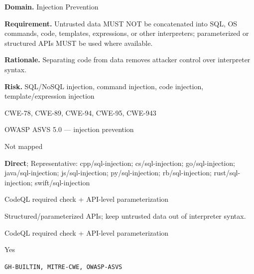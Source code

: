 \documentclass[10pt,letterpaper]{article}
\newcommand{\prioritybadge}[2]{\tcbox[on line,boxrule=0pt,arc=1.2mm,boxsep=0.7mm,left=1mm,right=1mm,top=0.4mm,bottom=0.4mm,colback=#2!12,coltext=#2]{\scriptsize\bfseries #1}}
\begin{document}
\begin{rulebox}[title={\texttt{SCS-ALL-INJ-001} \hfill \prioritybadge{Critical Control}{Critical}}]
\textbf{Domain.} Injection Prevention

\textbf{Requirement.} Untrusted data MUST NOT be concatenated into SQL, OS commands, code, templates, expressions, or other interpreters; parameterized or structured APIs MUST be used where available.

\textbf{Rationale.} Separating code from data removes attacker control over interpreter syntax.

\textbf{Risk.} SQL/NoSQL injection, command injection, code injection, template/expression injection

\begin{description}[leftmargin=2.65cm,labelwidth=2.3cm,style=nextline,itemsep=1pt,topsep=3pt]
  \item[CWE] CWE-78, CWE-89, CWE-94, CWE-95, CWE-943
  \item[OWASP] OWASP ASVS 5.0 --- injection prevention
  \item[CERT] Not mapped
  \item[CodeQL] \textbf{Direct}; Representative: cpp/sql-injection; cs/sql-injection; go/sql-injection; java/sql-injection; js/sql-injection; py/sql-injection; rb/sql-injection; rust/sql-injection; swift/sql-injection
  \item[Enforcement] CodeQL required check + API-level parameterization
  \item[Prevention] Structured/parameterized APIs; keep untrusted data out of interpreter syntax.
  \item[Verification] CodeQL required check + API-level parameterization
  \item[Automation] Yes
  \item[Sources] \texttt{GH-BUILTIN, MITRE-CWE, OWASP-ASVS}
\end{description}
\end{rulebox}
\end{document}
